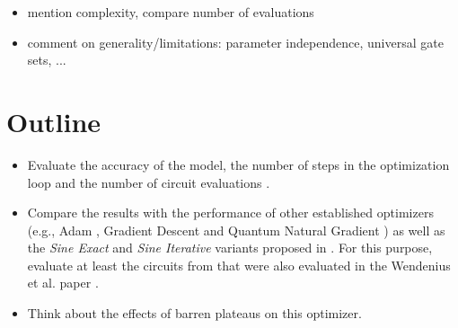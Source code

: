 \begin{itemize}
    \item mention complexity, compare number of evaluations
    \item comment on generality/limitations: parameter independence, universal gate sets, ...
\end{itemize}

\section{Outline}
\begin{itemize}
    \item
        Evaluate the accuracy of the model, the number of steps in the
        optimization loop and the number of circuit evaluations
        \cite{wendenius_gradient-free_2023,ostaszewski_structure_2021}.
    \item
        Compare the results with the performance of other established
        optimizers (e.g., Adam \cite{kingma_adam_2017}, Gradient Descent and
        Quantum Natural Gradient \cite{stokes_quantum_2020}) as well as the
        \emph{Sine Exact} and \emph{Sine Iterative} variants proposed in
        \cite{wendenius_gradient-free_2023}.
        For this purpose, evaluate at least the circuits from
        \cite{sim_expressibility_2019} that were also evaluated in the
        Wendenius et al. paper \cite{wendenius_gradient-free_2023}.
    \item
        Think about the effects of barren plateaus on this optimizer.
\end{itemize}
